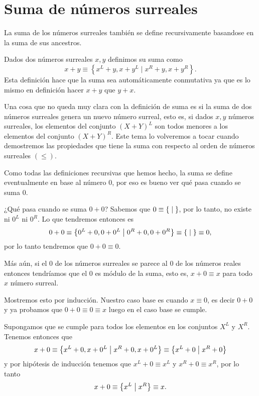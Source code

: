 \section{Suma de números surreales}

    La suma de los números surreales también se define recursivamente basandose en la suma de sus ancestros.
    
    \begin{definition}
        Dados dos n\'umeros surreales $x,y$ definimos su suma como
        \[
            x + y  \equiv \left\{x^L+y, x+y^L\;|\;x^R+y, x+y^R\right\}.
        \]
        Esta definici\'on hace que la suma sea autom\'aticamente conmutativa ya que es lo mismo en definici\'on hacer $x+y$ que $y+x$.
    \end{definition}

    Una cosa que no queda muy clara con la definici\'on de suma es si la suma de dos n\'umeros surreales genera un nuevo n\'umero surreal, esto es, si dados $x,y$ n\'umeros surreales, los elementos del conjunto $(X+Y)^L$ son todos menores a los elementos del conjunto $(X+Y)^R$. Este tema lo volveremos a tocar cuando demostremos las propiedades que tiene la suma con respecto al orden de n\'umeros surreales $(\le)$.

    Como todas las definiciones recursivas que hemos hecho, la suma se define eventualmente en base al número $0$, por eso es bueno ver qué pasa cuando se suma $0$.

    \begin{example}
        ¿Qué pasa cuando se suma $0+0$? Sabemos que $0 \equiv \left\{\;\middle|\; \right\}$, por lo tanto, no existe ni $0^L$ ni $0^R$. Lo que tendremos entonces es
        \[
            0+0 \equiv \left\{0^L+0, 0+0^L\;\middle|\; 0^R+0, 0+0^R\right\} \equiv \left\{\;\middle|\; \right\} \equiv 0,
        \]
        por lo tanto tendremos que $0+0 \equiv 0$.
    \end{example}

    \begin{example}
        Más aún, si el $0$ de los números surreales se parece al $0$ de los números reales entonces tendríamos que el $0$ es módulo de la suma, esto es, $x+0 \equiv x$ para todo $x$ n\'umero surreal.

        Mostremos esto por inducci\'on. Nuestro caso base es cuando $x \equiv 0$, es decir $0+0$ y ya probamos que $0+0\equiv 0\equiv x$ luego en el caso base se cumple.

        Supongamos que se cumple para todos los elementos en los conjuntos $X^L$ y $X^R$. Tenemos entonces que
        \[
            x + 0 \equiv \left\{x^L+0, x+0^L\;\middle|\; x^R+0, x+0^L\right\} \equiv \left\{x^L+0\;\middle|\; x^R+0\right\}
        \]
        y por hip\'otesis de inducci\'on tenemos que $x^L+0 \equiv x^L$ y $x^R+0 \equiv x^R$, por lo tanto 
        \[
            x + 0 \equiv \left\{x^L\;\middle|\; x^R\right\} \equiv x.
        \]
    \end{example}

